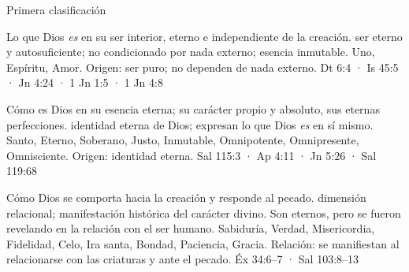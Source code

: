 \documentclass[hyperref={bookmarks=false},aspectratio=169]{beamer}
\begin{document}
\begin{frame}{Primera clasificación}
\end{frame}

 {Lo que Dios \emph{es} en su ser interior, eterno e independiente de la creación.}
 {ser eterno y autosuficiente; no condicionado por nada externo; esencia inmutable.}
 {Uno, Espíritu, Amor.}
 {Origen: ser puro; no dependen de nada externo.}
 {Dt 6:4 · Is 45:5 · Jn 4:24 · 1 Jn 1:5 · 1 Jn 4:8}

 {Cómo es Dios en su esencia eterna; su carácter propio y absoluto, sus eternas perfecciones.}
 {identidad eterna de Dios; expresan lo que Dios \emph{es} en sí mismo.}
 {Santo, Eterno, Soberano, Justo, Inmutable, Omnipotente, Omnipresente, Omnisciente.}
 {Origen: identidad eterna.}
 {Sal 115:3 · Ap 4:11 · Jn 5:26 · Sal 119:68}

 {Cómo Dios se comporta hacia la creación y responde al pecado.}
 {dimensión relacional; manifestación histórica del carácter divino. Son eternos, pero se fueron revelando en la relación con el ser humano.}
 {Sabiduría, Verdad, Misericordia, Fidelidad, Celo, Ira santa, Bondad, Paciencia, Gracia.}
 {Relación: se manifiestan al relacionarse con las criaturas y ante el pecado.}
 {Éx 34:6–7 · Sal 103:8–13}
\end{document}
